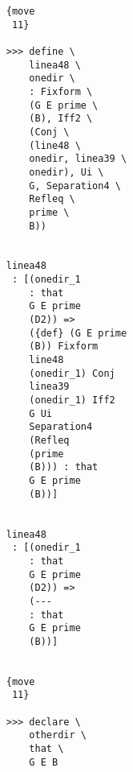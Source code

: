 \documentclass[12pt]{article}
\begin{document}
\begin{verbatim}
                                    {move 
                                     11}

                                    >>> define \
                                        linea48 \
                                        onedir \
                                        : Fixform \
                                        (G E prime \
                                        (B), Iff2 \
                                        (Conj \
                                        (line48 \
                                        onedir, linea39 \
                                        onedir), Ui \
                                        G, Separation4 \
                                        Refleq \
                                        prime \
                                        B))


                                    linea48 
                                     : [(onedir_1 
                                        : that 
                                        G E prime 
                                        (D2)) => 
                                        ({def} (G E prime 
                                        (B)) Fixform 
                                        line48 
                                        (onedir_1) Conj 
                                        linea39 
                                        (onedir_1) Iff2 
                                        G Ui 
                                        Separation4 
                                        (Refleq 
                                        (prime 
                                        (B))) : that 
                                        G E prime 
                                        (B))]


                                    linea48 
                                     : [(onedir_1 
                                        : that 
                                        G E prime 
                                        (D2)) => 
                                        (--- 
                                        : that 
                                        G E prime 
                                        (B))]


                                    {move 
                                     11}

                                    >>> declare \
                                        otherdir \
                                        that \
                                        G E B



\end{verbatim}
\end{document}
